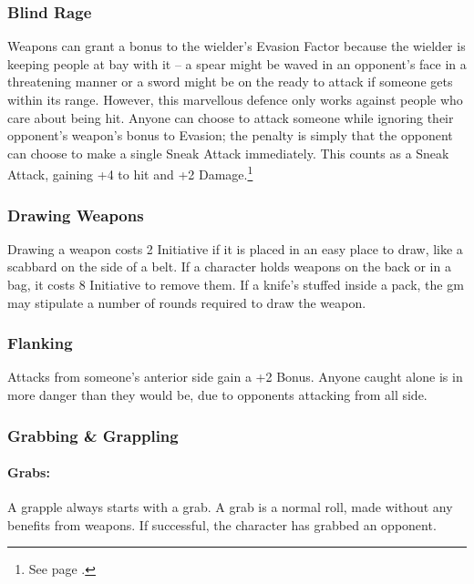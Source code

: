 \documentclass[titlepage,a4paper,openany]{book}
\begin{document}
\begin{multicols}{2}
\subsubsection{Blind Rage}\label{blind}

Weapons can grant a bonus to the wielder's Evasion Factor because the wielder is keeping people at bay with it -- a spear might be waved in an opponent's face in a threatening manner or a sword might be on the ready to attack if someone gets within its range. However, this marvellous defence only works against people who care about being hit. Anyone can choose to attack someone while ignoring their opponent's weapon's bonus to Evasion; the penalty is simply that the opponent can choose to make a single Sneak Attack immediately. This counts as a Sneak Attack, gaining +4 to hit and +2 Damage.\footnote{See page \pageref{sneakattack}.}

\subsubsection{Drawing Weapons}

Drawing a weapon costs 2 Initiative if it is placed in an easy place to draw, like a scabbard on the side of a belt. If a character holds weapons on the back or in a bag, it costs 8 Initiative to remove them. If a knife's stuffed inside a pack, the \gls{gm} may stipulate a number of \glspl{round} required to draw the weapon.

\subsubsection{Flanking}

Attacks from someone's anterior side gain a +2 Bonus.  Anyone caught alone is in more danger than they would be, due to opponents attacking from all side.

\subsubsection{Grabbing \& Grappling}

\paragraph{Grabs:}

A grapple always starts with a grab.  A grab is a normal roll, made without any benefits from weapons.  If successful, the character has grabbed an opponent.


\end{multicols}
\end{document}
